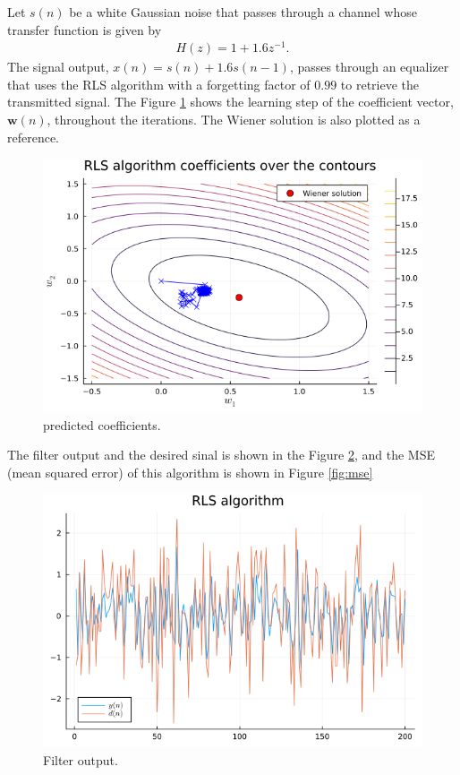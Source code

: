 \documentclass[12pt,a4paper]{article}
\begin{document}
Let \(s(n)\) be a white Gaussian noise that passes through a channel whose transfer function is given by
\begin{align}
    H(z) = 1 + 1.6z^{-1}.
\end{align}
The signal output, \(x(n) = s(n) + 1.6s(n-1)\), passes through an equalizer that uses the RLS algorithm with a forgetting factor of \(0.99\) to retrieve the transmitted signal. The Figure \ref{fig:channel-predicted-coeff} shows the learning step of the coefficient vector, \(\mathbf{w}(n)\), throughout the iterations. The Wiener solution is also plotted as a reference.
\begin{figure}[H]
    \centering
    \includegraphics[scale=.4]{../figs/q2_contour.png}
    \caption{predicted coefficients.}
    \label{fig:channel-predicted-coeff}
\end{figure}

The filter output and the desired sinal is shown in the Figure \ref{fig:channel-output}, and the MSE (mean squared error) of this algorithm is shown in Figure \ref{fig:mse}
\begin{figure}[H]
    \centering
    \includegraphics[scale=.4]{../figs/q2_rls_algorithm_output.png}
    \caption{Filter output.}
    \label{fig:channel-output}
\end{figure}
\end{document}
